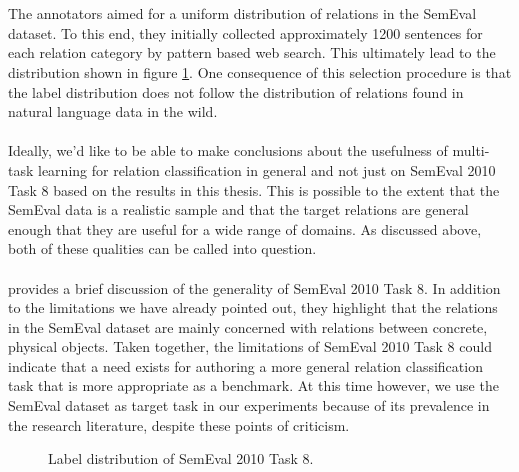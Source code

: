\\\\
The annotators aimed for a uniform distribution of relations in the SemEval dataset. To this end, they initially collected approximately 1200 sentences for each relation category by pattern based web search. This ultimately lead to the distribution shown in figure \ref{semeval_dist}. One consequence of this selection procedure is that the label distribution does not follow the distribution of relations found in natural language data in the wild.
\\\\
Ideally, we'd like to be able to make conclusions about the usefulness of multi-task learning for relation classification in general and not just on SemEval 2010 Task 8 based on the results in this thesis. This is possible to the extent that the SemEval data is a realistic sample and that the target relations are general enough that they are useful for a wide range of domains. As discussed above, both of these qualities can be called into question.
\\\\
\citet{handschuh2016} provides a brief discussion of the generality of SemEval 2010 Task 8. In addition to the limitations we have already pointed out, they highlight that the relations in the SemEval dataset are mainly concerned with relations between concrete, physical objects. Taken together, the limitations of SemEval 2010 Task 8 could indicate that a need exists for authoring a more general relation classification task that is more appropriate as a benchmark. At this time however, we use the SemEval dataset as target task in our experiments because of its prevalence in the research literature, despite these points of criticism.

\begin{figure}
	\center
	
	\caption{Label distribution of SemEval 2010 Task 8.}
	\label{semeval_dist}
\end{figure}
